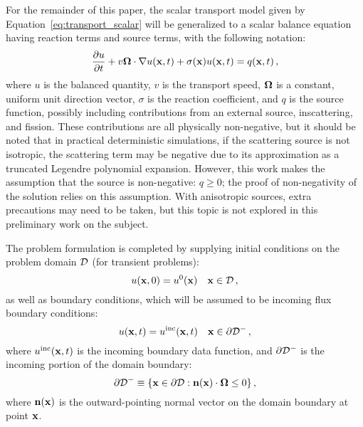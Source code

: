 For the remainder of this paper, the scalar transport model given by
Equation~\eqref{eq:transport_scalar} will be generalized to a scalar
balance equation having reaction terms and source terms, with the following
notation:
\begin{equation}\label{eq:scalar_model}
  \frac{\partial u}{\partial t} + v\mathbf{\Omega}\cdot\nabla u(\mathbf{x},t)
    + \sigma(\mathbf{x}) u(\mathbf{x},t) = q(\mathbf{x},t)
  \,,
\end{equation}
where $u$ is the balanced quantity, $v$ is the transport speed, $\mathbf{\Omega}$ is
a constant, uniform unit direction vector, $\sigma$ is the reaction coefficient,
and $q$ is the source function, possibly including contributions from an external
source, inscattering, and fission. These contributions are all physically non-negative,
but it should be noted that in practical deterministic simulations, if the scattering
source is not isotropic, the scattering term may be negative due to its approximation
as a truncated Legendre polynomial expansion. However, this work makes the assumption that
the source is non-negative: $q \ge 0$; the proof of non-negativity of the solution
relies on this assumption. With anisotropic sources, extra precautions may need
to be taken, but this topic is not explored in this preliminary work on the subject.

The problem formulation is completed by supplying initial conditions on the
problem domain $\mathcal{D}$ (for transient problems):
\begin{equation}
  u(\mathbf{x},0) = u^0(\mathbf{x}) \quad \mathbf{x}\in\mathcal{D} \,,
\end{equation}
as well as boundary conditions,
which will be assumed to be incoming flux boundary conditions:
\begin{equation}
  u(\mathbf{x},t) = u^{\textup{inc}}(\mathbf{x},t) \quad \mathbf{x}\in\partial\mathcal{D}^- \,,
\end{equation}
where $u^{\textup{inc}}(\mathbf{x},t)$ is the incoming boundary data function, and
$\partial\mathcal{D}^-$ is the incoming portion of the domain boundary:
\begin{equation}
  \partial\mathcal{D}^- \equiv \{ \mathbf{x}\in\partial\mathcal{D} :
  \mathbf{n}(\mathbf{x})\cdot\mathbf{\Omega} \leq 0 \} \,,
\end{equation}
where $\mathbf{n}(\mathbf{x})$ is the outward-pointing normal vector on the domain
boundary at point $\mathbf{x}$.

